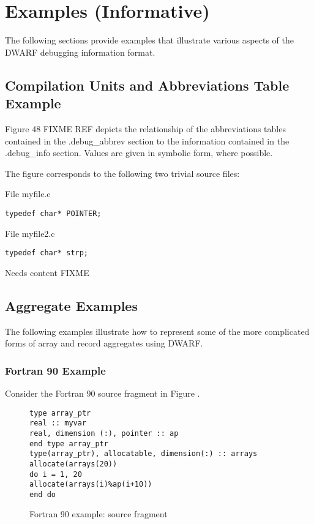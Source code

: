\chapter{Examples (Informative)}
\label{app:examplesinformative}

The following sections provide examples that illustrate
various aspects of the DWARF debugging information format.



\section{ Compilation Units and Abbreviations Table Example}
\label{app:compilationunitsandabbreviationstableexample}


Figure 48  FIXME REF
depicts the relationship of the abbreviations tables contained
in the .debug\_abbrev section to the information contained in
the .debug\_info section. Values are given in symbolic form,
where possible.

The figure corresponds to the following two trivial source files:

File myfile.c
\begin{lstlisting}
typedef char* POINTER;
\end{lstlisting}
File myfile2.c
\begin{lstlisting}
typedef char* strp;
\end{lstlisting}


Needs content FIXME

\section{Aggregate Examples}
\label{app:aggregateexamples}

The following examples illustrate how to represent some of
the more complicated forms of array and record aggregates
using DWARF.

\subsection{Fortran 90 Example}
\label{app:fortran90example}
Consider the Fortran 90 source fragment in 
Figure .

\begin{figure}[here]
\begin{lstlisting}
type array_ptr
real :: myvar
real, dimension (:), pointer :: ap
end type array_ptr
type(array_ptr), allocatable, dimension(:) :: arrays
allocate(arrays(20))
do i = 1, 20
allocate(arrays(i)%ap(i+10))
end do
\end{lstlisting}
\caption{Fortran 90 example: source fragment} \label{fig:fortran90examplesourcefragment}
\end{figure}


